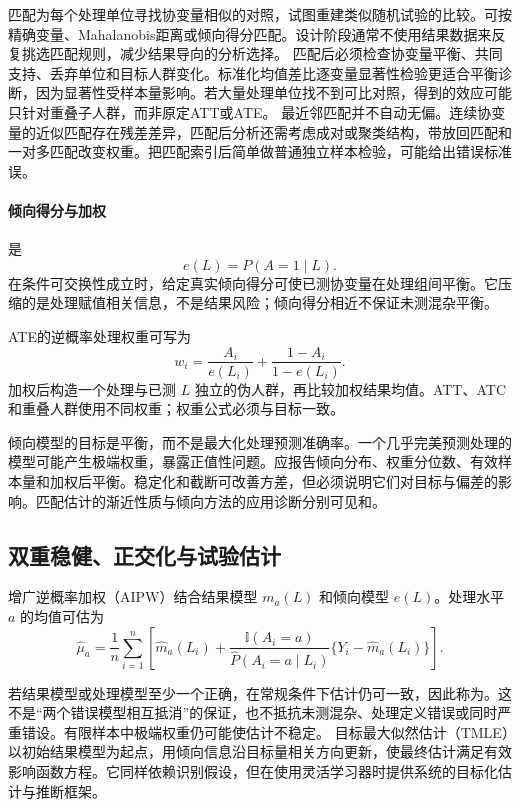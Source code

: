 匹配为每个处理单位寻找协变量相似的对照，试图重建类似随机试验的比较。可按精确变量、Mahalanobis距离或倾向得分匹配。设计阶段通常不使用结果数据来反复挑选匹配规则，减少结果导向的分析选择。
匹配后必须检查协变量平衡、共同支持、丢弃单位和目标人群变化。标准化均值差比逐变量显著性检验更适合平衡诊断，因为显著性受样本量影响。若大量处理单位找不到可比对照，得到的效应可能只针对重叠子人群，而非原定ATT或ATE。
最近邻匹配并不自动无偏。连续协变量的近似匹配存在残差差异，匹配后分析还需考虑成对或聚类结构，带放回匹配和一对多匹配改变权重。把匹配索引后简单做普通独立样本检验，可能给出错误标准误。

\paragraph{倾向得分与加权}

是
\[
e(L)=P(A=1\mid L).
\]
在条件可交换性成立时，给定真实倾向得分可使已测协变量在处理组间平衡\parencite{rosenbaumrubin1983}。它压缩的是处理赋值相关信息，不是结果风险；倾向得分相近不保证未测混杂平衡。

ATE的逆概率处理权重可写为
\[
w_i=\frac{A_i}{e(L_i)}+\frac{1-A_i}{1-e(L_i)}.
\]
加权后构造一个处理与已测 $L$ 独立的伪人群，再比较加权结果均值。ATT、ATC和重叠人群使用不同权重；权重公式必须与目标一致。

倾向模型的目标是平衡，而不是最大化处理预测准确率。一个几乎完美预测处理的模型可能产生极端权重，暴露正值性问题。应报告倾向分布、权重分位数、有效样本量和加权后平衡。稳定化和截断可改善方差，但必须说明它们对目标与偏差的影响。匹配估计的渐近性质与倾向方法的应用诊断分别可见\textcite{abadieimbens2006}和\textcite{austin2011}。

\subsection{双重稳健、正交化与试验估计}

增广逆概率加权（AIPW）结合结果模型 $m_a(L)$ 和倾向模型 $e(L)$。处理水平 $a$ 的均值可估为
\[
\widehat\mu_a=\frac1n\sum_{i=1}^n
\left[
\widehat m_a(L_i)+
\frac{\mathbb I(A_i=a)}{\widehat P(A_i=a\mid L_i)}
\{Y_i-\widehat m_a(L_i)\}
\right].
\]

若结果模型或处理模型至少一个正确，在常规条件下估计仍可一致，因此称为。这不是“两个错误模型相互抵消”的保证，也不抵抗未测混杂、处理定义错误或同时严重错设。有限样本中极端权重仍可能使估计不稳定\parencite{bangrobins2005}。
目标最大似然估计（TMLE）以初始结果模型为起点，用倾向信息沿目标量相关方向更新，使最终估计满足有效影响函数方程\parencite{vanderlaanrose2011}。它同样依赖识别假设，但在使用灵活学习器时提供系统的目标化估计与推断框架。

